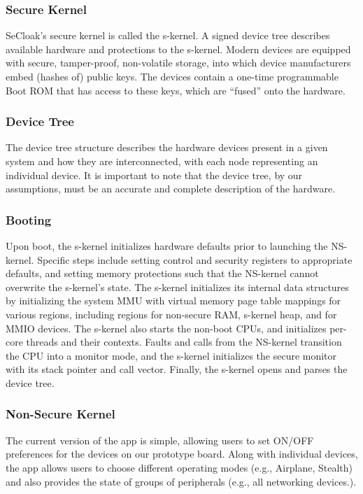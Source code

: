 \documentclass{article}
\begin{document}
\subsubsection{Secure Kernel}

SeCloak’s secure kernel is called the s-kernel. A signed device tree describes available hardware and protections to the s-kernel. Modern devices are equipped with secure, tamper-proof, non-volatile storage, into which device manufacturers embed (hashes of) public keys. The devices contain a one-time programmable Boot ROM that has access to these keys, which are “fused” onto the hardware.

\subsubsection{Device Tree}

The device tree structure describes the hardware devices present in a given system and how they are interconnected, with each node representing an individual device. It is important to note that the device tree, by our assumptions, must be an accurate and complete description of the hardware.

\subsubsection{Booting}

Upon boot, the s-kernel initializes hardware defaults prior to launching the NS-kernel. Specific steps include setting control and security registers to appropriate defaults, and setting memory protections such that the NS-kernel cannot overwrite the s-kernel’s state. The s-kernel initializes its internal data structures by initializing the system MMU with virtual memory page table mappings for various regions, including regions for non-secure RAM, s-kernel heap, and for MMIO devices. The s-kernel also starts the non-boot CPUs, and initializes per-core threads and their contexts. Faults and calls from the NS-kernel transition the CPU into a monitor mode, and the s-kernel initializes the secure monitor with its stack pointer and call vector. Finally, the s-kernel opens and parses the device tree.

\subsubsection{Non-Secure Kernel}

The current version of the app is simple, allowing users to set ON/OFF preferences for the devices on our prototype board. Along with individual devices, the app allows users to choose different operating modes (e.g., Airplane, Stealth) and also provides the state of groups of peripherals (e.g., all networking devices.).
\end{document}

